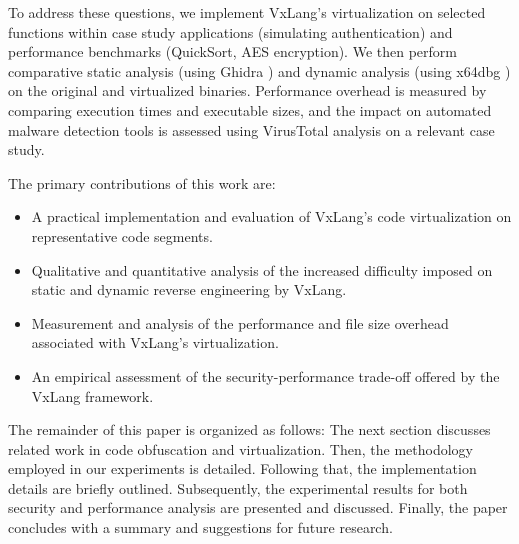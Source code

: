 To address these questions, we implement VxLang's virtualization on selected functions within case study applications (simulating authentication) and performance benchmarks (QuickSort, AES encryption). We then perform comparative static analysis (using Ghidra \cite{Nat19}) and dynamic analysis (using x64dbg \cite{Dun14}) on the original and virtualized binaries. Performance overhead is measured by comparing execution times and executable sizes, and the impact on automated malware detection tools is assessed using VirusTotal analysis on a relevant case study.

The primary contributions of this work are:
\begin{itemize}
    \item A practical implementation and evaluation of VxLang's code virtualization on representative code segments.
    \item Qualitative and quantitative analysis of the increased difficulty imposed on static and dynamic reverse engineering by VxLang.
    \item Measurement and analysis of the performance and file size overhead associated with VxLang's virtualization.
    \item An empirical assessment of the security-performance trade-off offered by the VxLang framework.
\end{itemize}

The remainder of this paper is organized as follows: The next section discusses related work in code obfuscation and virtualization. Then, the methodology employed in our experiments is detailed. Following that, the implementation details are briefly outlined. Subsequently, the experimental results for both security and performance analysis are presented and discussed. Finally, the paper concludes with a summary and suggestions for future research.

